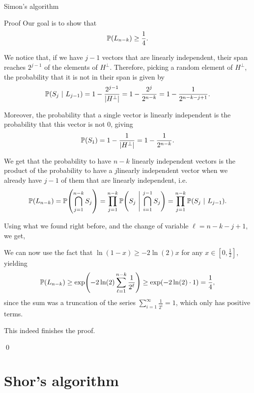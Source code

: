 \documentclass[a4paper]{article}
\begin{document}
\begin{parag}{Simon's algorithm}
\begin{subparag}{Proof}
        Our goal is to show that 
        \[\prob\left(L_{n-k}\right) \geq \frac{1}{4}.\]

        We notice that, if we have $j-1$ vectors that are linearly independent, their span reaches $2^{j-1}$ of the elements of $H^{\perp}$. Therefore, picking a random element of $H^{\perp}$, the probability that it is not in their span is given by
        \[\prob\left(S_{j} \suchthat L_{j-1}\right) = 1 - \frac{2^{j-1}}{\left|H^{\perp}\right|} = 1 - \frac{2^{j}}{2^{n-k}} = 1 - \frac{1}{2^{n-k-j+1}}.\]

        Moreover, the probability that a single vector is linearly independent is the probability that this vector is not 0, giving 
        \[\prob\left(S_1\right) = 1 - \frac{1}{\left|H^{\perp}\right|} = 1 - \frac{1}{2^{n-k}}.\]

        We get that the probability to have $n-k$ linearly independent vectors is the product of the probability to have a $j$\Th linearly independent vector when we already have $j-1$ of them that are linearly independent, i.e.
        \[\prob\left(L_{n-k}\right) = \prob\left(\bigcap_{j=1}^{n-k} S_j\right) = \prod_{j=1}^{n-k} \prob\left(S_j \suchthat \bigcap_{i=1}^{j-1} S_j\right) = \prod_{j=1}^{n-k} \prob\left(S_j \suchthat L_{j-1}\right).\]

        Using what we found right before, and the change of variable $\ell = n - k - j + 1$, we get, 

        We can now use the fact that $\ln\left(1 - x\right) \geq - 2 \ln\left(2\right) x$ for any $x \in \left[0, \frac{1}{2}\right]$, yielding 
        \[\prob\left(L_{n-k}\right) \geq \exp\left(- 2 \ln\left(2\right) \sum_{\ell = 1}^{n-k} \frac{1}{2^{\ell }}\right) \geq \exp\left(- 2 \ln\left(2\right)\cdot 1\right) = \frac{1}{4},\]
        since the sum was a truncation of the series $\sum_{i=1}^{\infty} \frac{1}{2^i} = 1$, which only has positive terms.

        This indeed finishes the proof.

        \qed
    \end{subparag}
\end{parag}

\section{Shor's algorithm}
\end{document}

